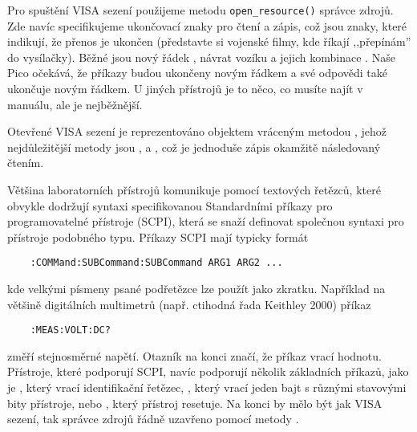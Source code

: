 Pro spuštění VISA sezení použijeme metodu \lstinline|open_resource()| správce zdrojů. Zde navíc specifikujeme ukončovací znaky pro čtení a zápis, což jsou znaky, které indikují, že přenos je ukončen (představte si vojenské filmy, kde říkají ,,přepínám'' do vysílačky). Běžné jsou nový řádek , návrat vozíku  a jejich kombinace . Naše Pico očekává, že příkazy budou ukončeny novým řádkem  a své odpovědi také ukončuje novým řádkem. U jiných přístrojů je to něco, co musíte najít v manuálu, ale  je nejběžnější.

Otevřené VISA sezení je reprezentováno objektem  vráceným metodou , jehož nejdůležitější metody jsou ,  a , což je jednoduše zápis okamžitě následovaný čtením.

Většina laboratorních přístrojů komunikuje pomocí textových řetězců, které obvykle dodržují syntaxi specifikovanou Standardními příkazy pro programovatelné přístroje (SCPI), která se snaží definovat společnou syntaxi pro přístroje podobného typu. Příkazy SCPI mají typicky formát
\begin{lstlisting}
    :COMMand:SUBCommand:SUBCommand ARG1 ARG2 ...
\end{lstlisting}
kde velkými písmeny psané podřetězce lze použít jako zkratku. Například na většině digitálních multimetrů (např. ctihodná řada Keithley 2000) příkaz
\begin{lstlisting}
    :MEAS:VOLT:DC?
\end{lstlisting}
změří stejnosměrné napětí. Otazník na konci značí, že příkaz vrací hodnotu. Přístroje, které podporují SCPI, navíc podporují několik základních příkazů, jako je , který vrací identifikační řetězec, , který vrací jeden bajt s různými stavovými bity přístroje, nebo , který přístroj resetuje. Na konci by mělo být jak VISA sezení, tak správce zdrojů řádně uzavřeno pomocí metody .

